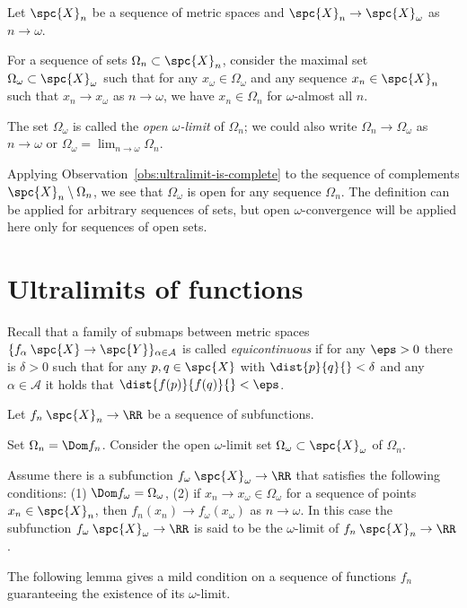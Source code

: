 Let $\spc{X}_n$ be a sequence of metric spaces and $\spc{X}_n\to \spc{X}_\omega$
as $n\to \omega$.

For a sequence of sets $\Omega_n\subset \spc{X}_n$,
consider the maximal set $\Omega_\omega\subset \spc{X}_\omega$ such that 
for any $x_\omega\in\Omega_\omega$ and any sequence $x_n\in\spc{X}_n$ such that $x_n\to x_\omega$ as $n\to \omega$, we have $x_n\in\Omega_n$ for $\omega$-almost all $n$.

The set $\Omega_\omega$ is called the  \emph{open $\omega$-limit} of $\Omega_n$;
we could also write  $\Omega_n\to \Omega_\omega$ as $n\to\omega$ or $\Omega_\omega=\lim_{n\to\omega}\Omega_n$. 

{\sloppy

Applying Observation~\ref{obs:ultralimit-is-complete} to the sequence of complements $\spc{X}_n\setminus \Omega_n$, we see that $\Omega_\omega$ is open for any sequence $\Omega_n$.
The definition can be applied for arbitrary sequences of sets, but  
open $\omega$-convergence  will be applied here only for sequences of open sets.

}

\section{Ultralimits of functions}

Recall that a family of submaps between metric spaces $\{f_\alpha\: \spc{X}\to\spc{Y}\}_{\alpha\in\mathcal A}$ is called \emph{equicontinuous} if for any $\eps>0$ there is $\delta>0$ such that for any $p,q\in\spc{X}$ with $\dist{p}{q}{}<\delta$ and any $\alpha\in\mathcal A$ it holds that $\dist{f(p)}{f(q)}{}<\eps$.

Let $f_n\:\spc{X}_n\to\RR$ be a sequence of subfunctions.

Set $\Omega_n=\Dom f_n$.
Consider the open $\omega$-limit set $\Omega_\omega\subset \spc{X}_\omega$ of $\Omega_n$.

Assume there is a subfunction $f_\omega\:\spc{X}_\omega\to\RR$
that satisfies the following conditions: 
(1) $\Dom f_\omega=\Omega_\omega$, (2) if $x_n\to x_\omega\in \Omega_\omega$ for a sequence of points $x_n\in\spc{X}_n$, then $f_n(x_n)\to f_\omega(x_\omega)$ as $n\to\omega$.
In this case 
the subfunction $f_\omega\:\spc{X}_\omega\to\RR$ 
is said to be the 
$\omega$-limit of $f_n\:\spc{X}_n\to\RR$.

The following lemma gives a mild condition on a sequence of functions $f_n$
guaranteeing the existence of its $\omega$-limit.

